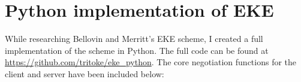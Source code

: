\chapter{Python implementation of EKE}
\label{chap:appendix-eke}

While researching Bellovin and Merritt's EKE scheme\cite{eke}, I created a full implementation of the scheme in Python.
The full code can be found at \url{https://github.com/tritoke/eke_python}.
The core negotiation functions for the client and server have been included below:


